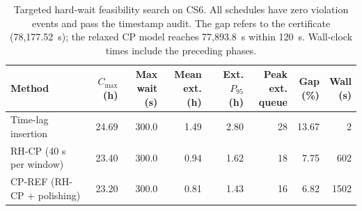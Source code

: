 \begin{table}[tbp]
\caption{Targeted hard-wait feasibility search on CS6. All schedules have zero violation events and pass the timestamp audit. The gap refers to the certificate (78,177.52~s); the relaxed CP model reaches 77,893.8~s within 120~s. Wall-clock times include the preceding phases.\label{tab:targeted}}
\centering
\footnotesize
\setlength{\tabcolsep}{3pt}
\begin{tabular*}{\textwidth}{@{\extracolsep{\fill}}lrrrrrrr@{}}
\toprule
Method & \shortstack{$C_{\max}$\\(h)} & \shortstack{Max wait\\(s)} & \shortstack{Mean ext.\\(h)} & \shortstack{Ext. $P_{95}$\\(h)} & \shortstack{Peak ext.\\queue} & \shortstack{Gap\\(\%)} & \shortstack{Wall\\(s)}\\
\midrule
Time-lag insertion & 24.69 & 300.0 & 1.49 & 2.80 & 28 & 13.67 & 2\\
RH-CP (40 s per window) & 23.40 & 300.0 & 0.94 & 1.62 & 18 & 7.75 & 602\\
CP-REF (RH-CP + polishing) & 23.20 & 300.0 & 0.81 & 1.43 & 16 & 6.82 & 1502\\
\bottomrule
\end{tabular*}
\end{table}
